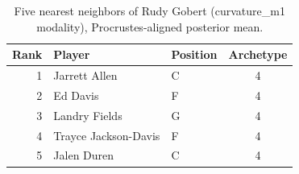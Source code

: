 \begin{table}[htbp]
  \centering\small
  \begin{tabular}{rllc}
    \toprule
    Rank & Player & Position & Archetype \\
    \midrule
    1 & Jarrett Allen & C & 4 \\
    2 & Ed Davis & F & 4 \\
    3 & Landry Fields & G & 4 \\
    4 & Trayce Jackson-Davis & F & 4 \\
    5 & Jalen Duren & C & 4 \\
    \bottomrule
  \end{tabular}
  \caption{Five nearest neighbors of Rudy Gobert (curvature_m1 modality), Procrustes-aligned posterior mean.}
  \label{tab:Rudy_Gobert_neighbors_curvature_m1}
\end{table}


